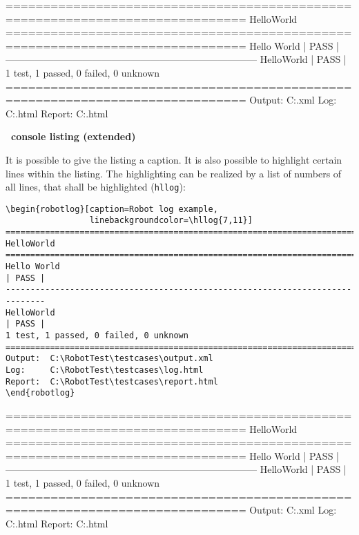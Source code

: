 \documentclass[a4paper,10pt]{report}
\begin{document}
\vspace{2ex}

\begin{robotlog}
==============================================================================
HelloWorld
==============================================================================
Hello World                                                           | PASS |
------------------------------------------------------------------------------
HelloWorld                                                            | PASS |
1 test, 1 passed, 0 failed, 0 unknown
==============================================================================
Output:  C:\RobotTest\testcases\output.xml
Log:     C:\RobotTest\testcases\log.html
Report:  C:\RobotTest\testcases\report.html
\end{robotlog}

\vspace{2ex}

\textbf{\rfw\ console listing (extended)}

It is possible to give the listing a caption. It is also possible to highlight certain lines within the listing. The highlighting can be realized by a list
of numbers of all lines, that shall be highlighted (\texttt{hllog}):

\vspace{2ex}

\begin{verbatim}
\begin{robotlog}[caption=Robot log example,
                 linebackgroundcolor=\hllog{7,11}]
==============================================================================
HelloWorld
==============================================================================
Hello World                                                           | PASS |
------------------------------------------------------------------------------
HelloWorld                                                            | PASS |
1 test, 1 passed, 0 failed, 0 unknown
==============================================================================
Output:  C:\RobotTest\testcases\output.xml
Log:     C:\RobotTest\testcases\log.html
Report:  C:\RobotTest\testcases\report.html
\end{robotlog}
\end{verbatim}

\newpage

\begin{robotlog}[caption=Robot log example,
                 linebackgroundcolor=\hllog{7,11}]
==============================================================================
HelloWorld
==============================================================================
Hello World                                                           | PASS |
------------------------------------------------------------------------------
HelloWorld                                                            | PASS |
1 test, 1 passed, 0 failed, 0 unknown
==============================================================================
Output:  C:\RobotTest\testcases\output.xml
Log:     C:\RobotTest\testcases\log.html
Report:  C:\RobotTest\testcases\report.html
\end{robotlog}
\end{document}
